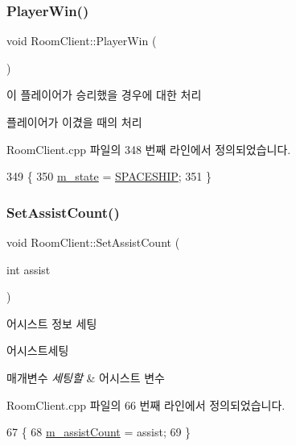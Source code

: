 \subsubsection{\texorpdfstring{Player\+Win()}{PlayerWin()}}
{\footnotesize\ttfamily void Room\+Client\+::\+Player\+Win (\begin{DoxyParamCaption}{ }\end{DoxyParamCaption})}



이 플레이어가 승리했을 경우에 대한 처리 

플레이어가 이겼을 때의 처리 

Room\+Client.\+cpp 파일의 348 번째 라인에서 정의되었습니다.


\begin{DoxyCode}
349 \{
350     \hyperlink{class_room_client_a247e5deb46a11e0d1a0e8e9029d87d54}{m\_state} = \hyperlink{stdafx_8h_a3c730f37b1b3a893159bada67637fdb1a5848c1d9acabf42d71255e110aee24c2}{SPACESHIP};
351 \}
\end{DoxyCode}
\mbox{\label{class_room_client_a6d250158da90c56d62a0b5ec7ecdd5aa}} 
\subsubsection{\texorpdfstring{Set\+Assist\+Count()}{SetAssistCount()}}
{\footnotesize\ttfamily void Room\+Client\+::\+Set\+Assist\+Count (\begin{DoxyParamCaption}\item[{int}]{assist }\end{DoxyParamCaption})}



어시스트 정보 세팅 

어시스트세팅


\begin{DoxyParams}{매개변수}
{\em 세팅할} & 어시스트 변수 \\
\hline
\end{DoxyParams}


Room\+Client.\+cpp 파일의 66 번째 라인에서 정의되었습니다.


\begin{DoxyCode}
67 \{
68     \hyperlink{class_room_client_adacb97c1fec85cb0efef063dc43073f5}{m\_assistCount} = assist;
69 \}
\end{DoxyCode}
\mbox{\label{class_room_client_af009e20b4d9f6209308ba65a99108132}} 
